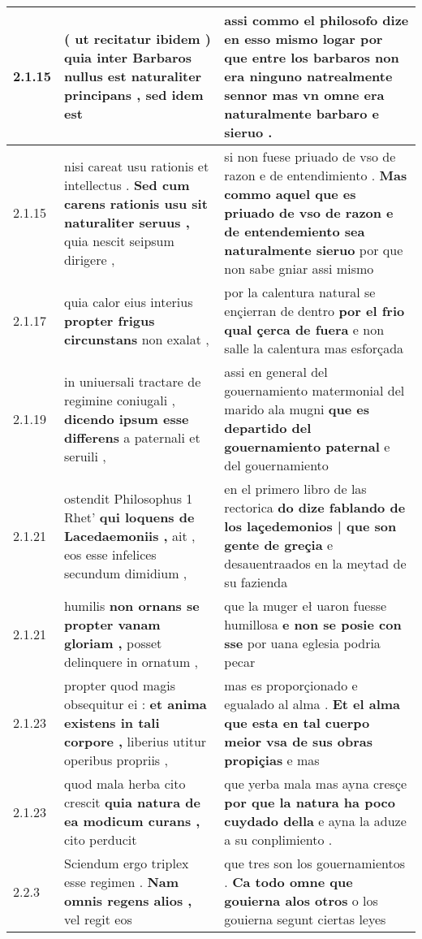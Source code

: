 \begin{tabular}{|p{1cm}|p{6.5cm}|p{6.5cm}|}
2.1.15 & ( ut recitatur ibidem ) \textbf{ quia inter Barbaros nullus est naturaliter principans , } sed idem est & assi commo el philosofo dize en esso mismo logar \textbf{ por que entre los barbaros non era ninguno natrealmente sennor } mas vn omne era naturalmente barbaro e sieruo . \\\hline
2.1.15 & nisi careat usu rationis et intellectus . \textbf{ Sed cum carens rationis usu sit naturaliter seruus , } quia nescit seipsum dirigere , & si non fuese priuado de vso de razon e de entendimiento . \textbf{ Mas commo aquel que es priuado de vso de razon e de entendemiento sea naturalmente sieruo } por que non sabe gniar assi mismo \\\hline
2.1.17 & quia calor eius interius \textbf{ propter frigus circunstans } non exalat , & por la calentura natural se ençierran de dentro \textbf{ por el frio qual çerca de fuera } e non salle la calentura mas esforçada \\\hline
2.1.19 & in uniuersali tractare de regimine coniugali , \textbf{ dicendo ipsum esse differens } a paternali et seruili , & assi en general del gouernamiento matermonial del marido ala mugni \textbf{ que es departido del gouernamiento paternal } e del gouernamiento \\\hline
2.1.21 & ostendit Philosophus 1 Rhet’ \textbf{ qui loquens de Lacedaemoniis , } ait , eos esse infelices secundum dimidium , & en el primero libro de las rectorica \textbf{ do dize fablando de los laçedemonios | que son gente de greçia } e desauentraados en la meytad de su fazienda \\\hline
2.1.21 & humilis \textbf{ non ornans se propter vanam gloriam , } posset delinquere in ornatum , & que la muger eł uaron fuesse humillosa \textbf{ e non se posie con sse } por uana eglesia podria pecar \\\hline
2.1.23 & propter quod magis obsequitur ei : \textbf{ et anima existens in tali corpore , } liberius utitur operibus propriis , & mas es proporçionado e egualado al alma . \textbf{ Et el alma que esta en tal cuerpo meior vsa de sus obras propiçias } e mas \\\hline
2.1.23 & quod mala herba cito crescit \textbf{ quia natura de ea modicum curans , } cito perducit & que yerba mala mas ayna cresçe \textbf{ por que la natura ha poco cuydado della } e ayna la aduze a su conplimiento . \\\hline
2.2.3 & Sciendum ergo triplex esse regimen . \textbf{ Nam omnis regens alios , } vel regit eos & que tres son los gouernamientos . \textbf{ Ca todo omne que gouierna alos otros } o los gouierna segunt ciertas leyes \\\hline

\end{tabular}
